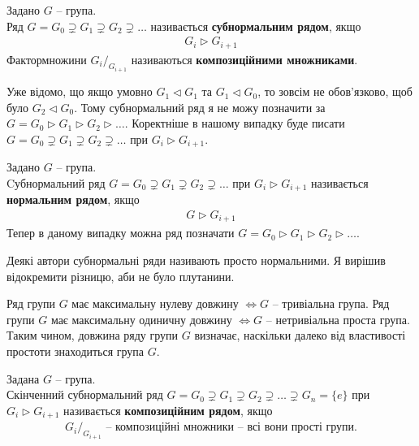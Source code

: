\documentclass{math_library}
\begin{document}
\begin{definition}
Задано $G$ -- група.\\
Ряд $G = G_0 \supsetneq G_1 \supsetneq G_2 \supsetneq \dots$ називається \textbf{субнормальним рядом}, якщо
\begin{align*}
G_i \triangleright G_{i+1}
\end{align*}
Фактормножини ${G_i}/_{G_{i+1}}$ називаються \textbf{композиційними множниками}.
\end{definition}

\begin{remark}
Уже відомо, що якщо умовно $G_1 \triangleleft G_1$ та $G_1 \triangleleft G_0$, то зовсім не обов'язково, щоб було $G_2 \triangleleft G_0$. Тому субнормальний ряд я не можу позначити за $G = G_0 \triangleright G_1 \triangleright G_2 \triangleright \dots$. Коректніше в нашому випадку буде писати $G = G_0 \supsetneq G_1 \supsetneq G_2 \supsetneq \dots$ при $G_i \triangleright G_{i+1}$.
\end{remark}

\begin{definition}
Задано $G$ -- група.\\
Cубнормальний ряд $G = G_0 \supsetneq G_1 \supsetneq G_2 \supsetneq \dots$ при $G_i \triangleright G_{i+1}$ називається \textbf{нормальним рядом}, якщо
\begin{align*}
G \triangleright G_{i+1}
\end{align*}
Тепер в даному випадку можна ряд позначати $G = G_0 \triangleright G_1 \triangleright G_2 \triangleright \dots$.
\end{definition}

\begin{remark}
Деякі автори субнормальні ряди називають просто нормальними. Я вирішив відокремити різницю, аби не було плутанини.
\end{remark}

\begin{remark}
Ряд групи $G$ має максимальну нулеву довжину $\iff G$ -- тривіальна група. Ряд групи $G$ має максимальну одиничну довжину $\iff G$ -- нетривіальна проста група.\\
Таким чином, довжина ряду групи $G$ визначає, наскільки далеко від властивості простоти знаходиться група $G$.
\end{remark}

\begin{definition}
Задана $G$ -- група.\\
Скінченний субнормальний ряд $G = G_0 \supsetneq G_1 \supsetneq G_2 \supsetneq \dots \supsetneq G_n = \{e\}$ при $G_i \triangleright G_{i+1}$ називається \textbf{композиційним рядом}, якщо
\begin{align*}
G_i/_{G_{i+1}} \text{ -- композиційні множники -- всі вони прості групи.}
\end{align*}
\end{definition}
\end{document}
